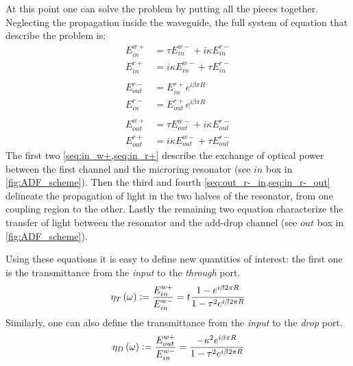 At this point one can solve the problem by putting all the pieces together.
Neglecting the propagation inside the waveguide, the full system of equation that describe the problem is:
\begin{subequations}
\begin{align}
E^{w+}_{in}	&= \tau 		 E^{w-}_{in} + i\kappa	E^{r-}_{in} \label{seq:in_w+}\\
E^{r+}_{in}	&= i\kappa	 E^{w-}_{in} + \tau 		E^{r-}_{in} \label{seq:in_r+}\\
\nonumber\\
E^{r-}_{out}	&= E^{r+}_{in}		e^{i\beta \pi R } \label{seq:out_r-_in}\\
E^{r-}_{in}	&= E^{r+}_{out}	e^{i\beta \pi R } \label{seq:in_r-_out}\\
\nonumber\\
E^{w+}_{out}	&= \tau 		 E^{w-}_{out} + i\kappa	E^{r-}_{out} \label{seq:out_w+}\\
E^{r+}_{out}	&= i\kappa	 E^{w-}_{out} + \tau 		E^{r-}_{out} \label{seq:out_r+}
\end{align}
\label{eq:ADF_equations}
\end{subequations}
The first two \cref{seq:in_w+,seq:in_r+} describe the exchange of optical power between the first channel and the microring resonator (see $in$ box in \autoref{fig:ADF_scheme}).
Then the third and fourth \cref{seq:out_r-_in,seq:in_r-_out} delineate the propagation of light in the two halves of the resonator, from one coupling region to the other.
Lastly the remaining two equation characterize the transfer of light between the resonator and the add-drop channel (see $out$ box in \autoref{fig:ADF_scheme}).

Using these equations it is easy to define new quantities of interest: the first one is the transmittance from the \textit{input} to the \textit{through} port.
\begin{equation}
\eta_T\left(\omega\right) \vcentcolon= \dfrac{E^{w+}_{in}}{E^{w-}_{in}}
	= t\dfrac{1-e^{i\beta 2\pi R}}{1-\tau^2e^{i\beta 2\pi R}}
\end{equation}
Similarly, one can also define the transmittance from the \textit{input} to the \textit{drop} port.
\begin{equation}
\eta_D\left(\omega\right) \vcentcolon= \dfrac{E^{w+}_{out}}{E^{w-}_{in}}
	= \dfrac{-\kappa^2e^{i\beta\pi R}}{1-\tau^2e^{i\beta 2\pi R}}
\end{equation}

